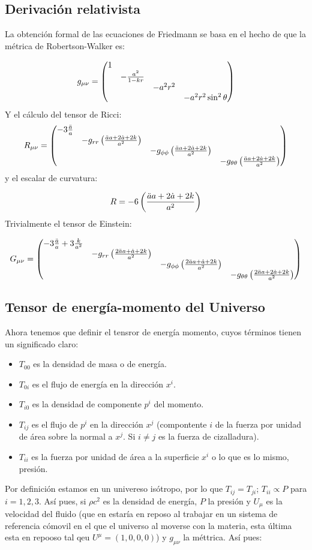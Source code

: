 \subsection{Derivación relativista}

La obtención formal de las ecuaciones de Friedmann se basa en el hecho de que la métrica de Robertson-Walker es:

\begin{equation}
	g_{\mu \nu} = \mqty(\dmat{1,-\frac{a^2}{1-kr},-a^2 r^2,-a^2 r^2 \sin^2 \theta})
\end{equation}
Y el cálculo del tensor de Ricci:
\begin{equation}
	R_{\mu \nu} = \mqty(\dmat{-3 \frac{\ddot{a}}{a}, - g_{rr} \parentesis{\frac{\ddot{a}a + 2 \dot{a}+2k}{a^2}},- g_{\phi \phi} \parentesis{\frac{\ddot{a}a + 2 \dot{a}+2k}{a^2}},- g_{\theta \theta} \parentesis{\frac{\ddot{a}a + 2 \dot{a}+2k}{a^2}}})
\end{equation}
y el escalar de curvatura:

\begin{equation}
	R = - 6 \left( \frac{\ddot{a}a + 2 \dot{a}+2k}{a^2} \right)
\end{equation}
Trivialmente el tensor de Einstein:

\begin{equation}
	G_{\mu \nu} = \mqty(\dmat{-3 \frac{\ddot{a}}{a}+ 3 \frac{k}{a^2},
		- g_{rr} \parentesis{\frac{2\ddot{a}a +  \dot{a}+2k}{a^2}},
		- g_{\phi \phi} \parentesis{\frac{2\ddot{a}a +  \dot{a}+2k}{a^2}},
		- g_{\theta \theta} \parentesis{\frac{2\ddot{a}a + 2 \dot{a}+2k}{a^2}}})
\end{equation}

\subsection{Tensor de energía-momento del Universo}

Ahora tenemos que definir el tensror de energía momento, cuyos términos tienen un significado claro:

\begin{itemize}
	\item $T_{00}$ es la densidad de masa o de energía.
	\item $T_{0i}$ es el flujo de energía en la dirección $x^i$.
	\item $T_{i0}$ es la densidad de componente $p^i$ del momento.
	\item $T_{ij}$ es el flujo de $p^i$ en la dirección $x^j$ (compontente $i$ de la fuerza por unidad de área sobre la normal a $x^j$. Si $i\neq j$ es la fuerza de cizalladura).
	\item $T_{ii}$ es la fuerza por unidad de área a la superficie $x^i$ o lo que es lo mismo, presión.
\end{itemize}
Por definición estamos en un univereso isótropo, por lo que $T_{ij}=T_{ji}$; $T_{ii}\propto P$ para $i=1,2,3$. Así pues, si $\rho c^2$ es la densidad de energía, $P$ la presión y $U_{\mu}$ es la velocidad del fluido (que en estaría en reposo al trabajar en un sistema de referencia cómovil en el que el universo al moverse con la materia, esta última esta en repooso tal qeu $U^{\mu}=(1,0,0,0)$) y $g_{\mu \nu}$ la méttrica. Así pues:

